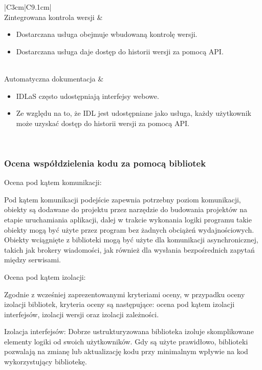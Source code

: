 \documentclass[runningheads,12pt]{llncs}
\begin{document}
\begin{longtable}{|C{3cm}|C{9.1cm}|}
     \\ \hline
    Zintegrowana kontrola wersji &
    \begin{itemize}
      \item Dostarczana usługa obejmuje wbudowaną kontrolę wersji.
      \item Dostarczana usługa daje dostęp do historii wersji za pomocą API.
    \end{itemize} \\ \hline
    Automatyczna dokumentacja &
    \begin{itemize}
      \item IDLaS często udostępniają interfejsy webowe.
      \item Ze względu na to, że IDL jest udostępniane jako usługa, każdy użytkownik może uzyskać dostęp do historii wersji za pomocą API.
    \end{itemize} \\ \hline

\end{longtable}

\subsubsection{Ocena współdzielenia kodu za pomocą bibliotek}

Ocena pod kątem komunikacji:

Pod kątem komunikacji podejście zapewnia potrzebny poziom komunikacji, obiekty są dodawane do projektu przez narzędzie do budowania projektów na etapie uruchamiania aplikacji, dalej w trakcie wykonania logiki programu takie obiekty mogą być użyte przez program bez żadnych obciążeń wydajnościowych. Obiekty wciągnięte z biblioteki mogą być użyte dla komunikacji asynchronicznej, takich jak brokery wiadomości, jak również dla wysłania bezpośrednich zapytań między serwisami.

Ocena pod kątem izolacji:

Zgodnie z wcześniej zaprezentowanymi kryteriami oceny, w przypadku oceny izolacji bibliotek, kryteria oceny są następujące: ocena pod kątem izolacji interfejsów, izolacji wersji oraz izolacji zależności.

Izolacja interfejsów: Dobrze ustrukturyzowana biblioteka izoluje skomplikowane elementy logiki od swoich użytkowników. Gdy są użyte prawidłowo, biblioteki pozwalają na zmianę lub aktualizację kodu przy minimalnym wpływie na kod wykorzystujący bibliotekę.  ~\cite[p. 75]{Essential}
\end{document}
